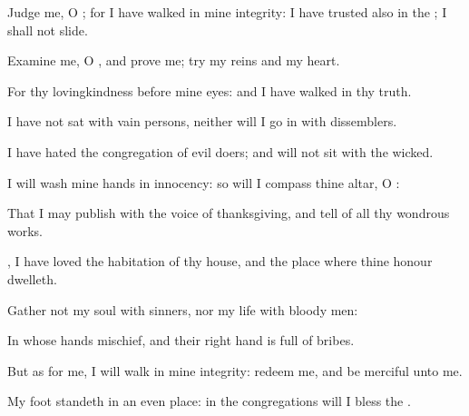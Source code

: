 {\Q {}Judge me, O
{}; for I have
walked in mine
integrity: I have
trusted also in the
{};
{} I shall not
slide.


\par }{\Q {}Examine me, O
{}, and
prove me;
try my
reins and my
heart.


\par }{\Q {}For thy
lovingkindness
{} before mine
eyes: and I have
walked in thy
truth.


\par }{\Q {}I have not
sat with
vain
persons, neither will I go
in with
dissemblers.


\par }{\Q {}I have
hated the
congregation of evil
doers; and will not
sit with the
wicked.


\par }{\BB \par }
{\Q {}I will
wash mine
hands in
innocency: so will I
compass thine
altar, O
{}:


\par }{\Q {}That I may
publish with the
voice of
thanksgiving, and
tell of all thy wondrous
works.


\par }{\Q {}, I have
loved the
habitation of thy
house, and the
place where thine
honour
dwelleth.


\par }{\Q {}Gather not my
soul with
sinners, nor my
life with
bloody
men:


\par }{\Q {}In whose
hands
{}
mischief, and their right
hand is
full of
bribes.


\par }{\Q {}But as for me, I will
walk in mine
integrity:
redeem me, and be
merciful unto me.


\par }{\Q {}My
foot
standeth in an even
place: in the
congregations will I
bless the
{}.




\par }
